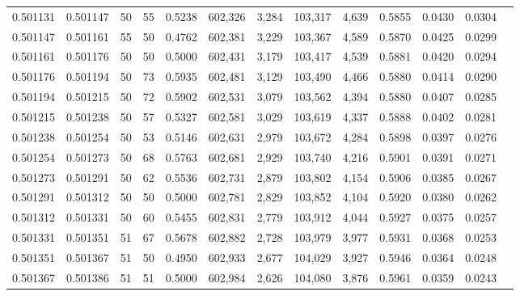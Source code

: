 \begin{tabular}{rrrrrrrrrrrrr}
0.501131 & 0.501147 &    50 &  55 &                                     0.5238 & 602,326 &   3,284 & 103,317 &   4,639 & 0.5855 & 0.0430 & 0.0304 \\
0.501147 & 0.501161 &    55 &  50 &                                     0.4762 & 602,381 &   3,229 & 103,367 &   4,589 & 0.5870 & 0.0425 & 0.0299 \\
0.501161 & 0.501176 &    50 &  50 &                                     0.5000 & 602,431 &   3,179 & 103,417 &   4,539 & 0.5881 & 0.0420 & 0.0294 \\
0.501176 & 0.501194 &    50 &  73 &                                     0.5935 & 602,481 &   3,129 & 103,490 &   4,466 & 0.5880 & 0.0414 & 0.0290 \\
0.501194 & 0.501215 &    50 &  72 &                                     0.5902 & 602,531 &   3,079 & 103,562 &   4,394 & 0.5880 & 0.0407 & 0.0285 \\
0.501215 & 0.501238 &    50 &  57 &                                     0.5327 & 602,581 &   3,029 & 103,619 &   4,337 & 0.5888 & 0.0402 & 0.0281 \\
0.501238 & 0.501254 &    50 &  53 &                                     0.5146 & 602,631 &   2,979 & 103,672 &   4,284 & 0.5898 & 0.0397 & 0.0276 \\
0.501254 & 0.501273 &    50 &  68 &                                     0.5763 & 602,681 &   2,929 & 103,740 &   4,216 & 0.5901 & 0.0391 & 0.0271 \\
0.501273 & 0.501291 &    50 &  62 &                                     0.5536 & 602,731 &   2,879 & 103,802 &   4,154 & 0.5906 & 0.0385 & 0.0267 \\
0.501291 & 0.501312 &    50 &  50 &                                     0.5000 & 602,781 &   2,829 & 103,852 &   4,104 & 0.5920 & 0.0380 & 0.0262 \\
0.501312 & 0.501331 &    50 &  60 &                                     0.5455 & 602,831 &   2,779 & 103,912 &   4,044 & 0.5927 & 0.0375 & 0.0257 \\
0.501331 & 0.501351 &    51 &  67 &                                     0.5678 & 602,882 &   2,728 & 103,979 &   3,977 & 0.5931 & 0.0368 & 0.0253 \\
0.501351 & 0.501367 &    51 &  50 &                                     0.4950 & 602,933 &   2,677 & 104,029 &   3,927 & 0.5946 & 0.0364 & 0.0248 \\
0.501367 & 0.501386 &    51 &  51 &                                     0.5000 & 602,984 &   2,626 & 104,080 &   3,876 & 0.5961 & 0.0359 & 0.0243 \\

\end{tabular}
